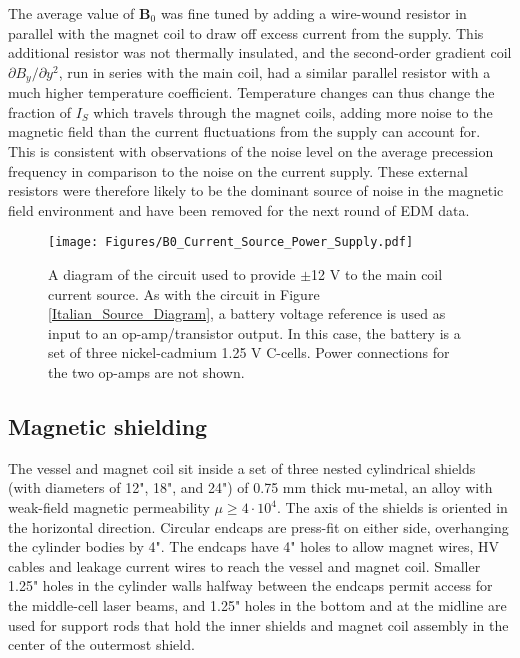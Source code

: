 \documentclass [10pt, twoside] {uwthesis}[2012/04/02]
\begin{document}
The average value of $\mathbf{B}_0$ was fine tuned by adding a wire-wound resistor in parallel with the magnet coil to draw off excess current from the supply. This additional resistor was not thermally insulated, and the second-order gradient coil $\partial B_y/\partial y^2$, run in series with the main coil, had a similar parallel resistor with a much higher temperature coefficient. Temperature changes can thus change the fraction of $I_S$ which travels through the magnet coils, adding more noise to the magnetic field than the current fluctuations from the supply can account for. This is consistent with observations of the noise level on the average precession frequency in comparison to the noise on the current supply. These external resistors were therefore likely to be the dominant source of noise in the magnetic field environment and have been removed for the next round of EDM data.

\begin{figure}
\begin{center}
\texttt{[image: Figures/B0\_Current\_Source\_Power\_Supply.pdf]}
\end{center}
\caption[$\mathbf{B}_0$ power supply diagram]{\narrower A diagram of the circuit used to provide $\pm$12 V to the main coil current source. As with the circuit in Figure \ref{Italian_Source_Diagram}, a battery voltage reference is used as input to an op-amp/transistor output. In this case, the battery is a set of three nickel-cadmium 1.25 V C-cells. Power connections for the two op-amps are not shown.}
\label{Italian_Source_Power_Supply}
\end{figure}

\subsection{Magnetic shielding}
The vessel and magnet coil sit inside a set of three nested cylindrical shields (with diameters of 12", 18", and 24") of 0.75 mm thick mu-metal, an alloy with weak-field magnetic permeability $\mu \geq 4\cdot10^4$. The axis of the shields is oriented in the horizontal direction. Circular endcaps are press-fit on either side, overhanging the cylinder bodies by 4". The endcaps have 4" holes to allow magnet wires, HV cables and leakage current wires to reach the vessel and magnet coil. Smaller 1.25" holes in the cylinder walls halfway between the endcaps permit access for the middle-cell laser beams, and 1.25" holes in the bottom and at the midline are used for support rods that hold the inner shields and magnet coil assembly in the center of the outermost shield. 
\end{document}
